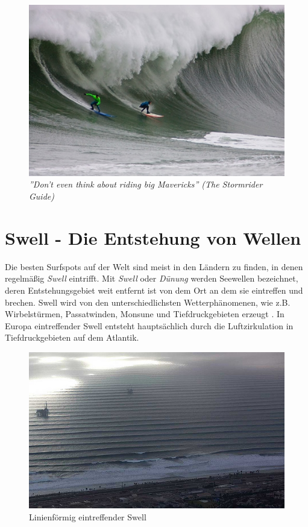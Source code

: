 \begin{figure}[h]
  \includegraphics[width=\textwidth]{bilder/mavericks}
  \caption{\textit{''Don't even think about riding big Mavericks'' (The Stormrider Guide)}}
\end{figure}



\section{Swell - Die Entstehung von Wellen}
Die besten Surfspots auf der Welt sind meist in den Ländern zu finden,
in denen regelmäßig \textit{Swell} eintrifft. Mit \textit{Swell} oder
\textit{Dünung} werden Seewellen bezeichnet, deren Entstehungs\-gebiet
weit entfernt ist von dem Ort an dem sie eintreffen und brechen. Swell
wird von den unterschiedlichsten Wetter\-phänomenen, wie
z.B. Wirbelstürmen, Passatwinden, Monsune und Tiefdruckgebieten
erzeugt \cite[S.15]{storm_europe_1998}. In Europa eintreffender Swell
entsteht hauptsächlich durch die Luftzirkulation in Tiefdruckgebieten
auf dem Atlantik.

\begin{figure}[h]
 \includegraphics[width=\textwidth]{bilder/swell}
 \caption{Linienförmig eintreffender Swell}
 \label{swell-lines}
\end{figure}

